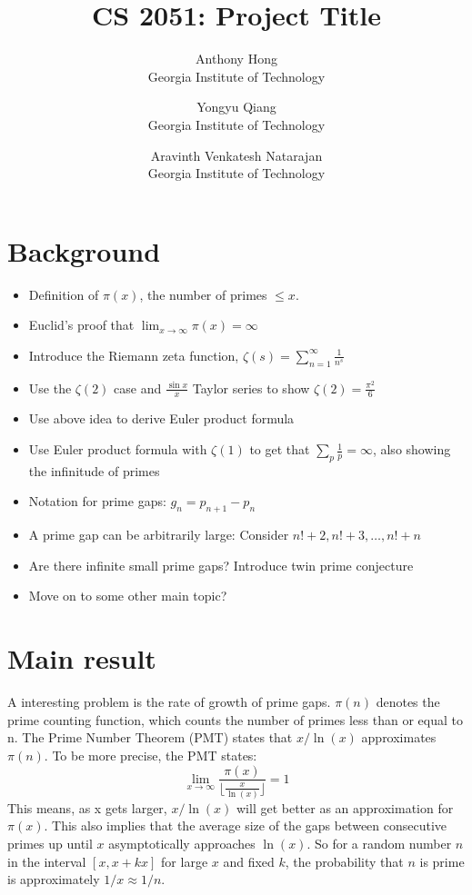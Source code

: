 \documentclass{article}
\title{CS 2051: Project Title}
\author{Anthony Hong \\ Georgia Institute of Technology
\and Yongyu Qiang \\ Georgia Institute of Technology
\and Aravinth Venkatesh Natarajan \\ Georgia Institute of Technology}
\date{}
\begin{document}
\maketitle

\section{Background}
\begin{itemize}
  \item Definition of $\pi(x)$, the number of primes $\le x$.
  \item Euclid's proof that $\lim_{x \to \infty}\pi(x) = \infty$
  \item Introduce the Riemann zeta function, $\zeta(s) = \sum_{n = 1}^{\infty}\frac{1}{n^s}$
  \item Use the $\zeta(2)$ case and $\frac{\sin{x}}{x}$ Taylor series to show $\zeta(2) = \frac{\pi^2}{6}$
  \item Use above idea to derive Euler product formula
  \item Use Euler product formula with $\zeta(1)$ to get that $\sum_{p}\frac{1}{p} = \infty$, also showing the infinitude of primes
  \item Notation for prime gaps: $g_n = p_{n + 1} - p_n$
  \item A prime gap can be arbitrarily large: Consider $n! + 2, n! + 3, \dots, n! + n$
  \item Are there infinite small prime gaps? Introduce twin prime conjecture
  \item Move on to some other main topic?
\end{itemize}


\section{Main result}
A interesting problem is the rate of growth of prime gaps. $\pi(n)$ denotes the prime counting function, which counts the number of primes less than or equal to n. The Prime Number Theorem (PMT) states that $x / \ln(x)$ approximates $\pi(n)$. To be more precise, the PMT states: \[\lim_{x \to \infty} \frac{\pi(x)}{\lfloor \frac{x}{\ln(x)} \rfloor} = 1\] 
This means, as x gets larger, $x / \ln(x)$ will get better as an approximation for $\pi(x)$. This also implies that the average size of the gaps between consecutive primes up until $x$ asymptotically approaches $\ln(x)$. So for a random number $n$ in the interval $[x, x + kx]$ for large $x$ and fixed $k$, the probability that $n$ is prime is approximately $1 / x \approx 1 / n$.
\end{document}
